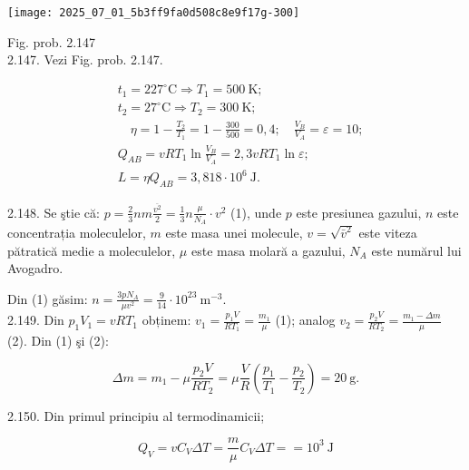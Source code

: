 \begin{center}
\texttt{[image: 2025\_07\_01\_5b3ff9fa0d508c8e9f17g-300]}
\end{center}

Fig. prob. 2.147\\
2.147. Vezi Fig. prob. 2.147.

$$
\begin{aligned}
& t_{1}=227^{\circ} \mathrm{C} \Rightarrow T_{1}=500 \mathrm{~K} ; \\
& t_{2}=27^{\circ} \mathrm{C} \Rightarrow T_{2}=300 \mathrm{~K} ; \\
& \quad \eta=1-\frac{T_{2}}{T_{1}}=1-\frac{300}{500}=0,4 ; \quad \frac{V_{B}}{V_{A}}=\varepsilon=10 ; \\
& Q_{A B}=v R T_{1} \ln \frac{V_{B}}{V_{A}}=2,3 v R T_{1} \ln \varepsilon ; \\
& L=\eta Q_{A B}=3,818 \cdot 10^{6} \mathrm{~J} .
\end{aligned}
$$

2.148. Se ştie că: $p=\frac{2}{3} n m \frac{\overline{v^{2}}}{2}=\frac{1}{3} n \frac{\mu}{N_{A}} \cdot v^{2}$ (1), unde $p$ este presiunea gazului, $n$ este concentrația moleculelor, $m$ este masa unei molecule, $v=\sqrt{\bar{v}^{2}}$ este viteza pătratică medie a moleculelor, $\mu$ este masa molară a gazului, $N_{A}$ este numărul lui Avogadro.

Din (1) găsim: $n=\frac{3 p N_{A}}{\mu v^{2}}=\frac{9}{14} \cdot 10^{23} \mathrm{~m}^{-3}$.\\
2.149. Din $p_{1} V_{1}=v R T_{1}$ obținem: $v_{1}=\frac{p_{1} V}{R T_{1}}=\frac{m_{1}}{\mu}$ (1); analog $v_{2}=\frac{p_{2} V}{R T_{2}}=\frac{m_{1}-\Delta m}{\mu}$ (2). Din (1) şi (2):

$$
\Delta m=m_{1}-\mu \frac{p_{2} V}{R T_{2}}=\mu \frac{V}{R}\left(\frac{p_{1}}{T_{1}}-\frac{p_{2}}{T_{2}}\right)=20 \mathrm{~g} .
$$

2.150. Din primul principiu al termodinamicii;

$$
Q_{V}=v C_{V} \Delta T=\frac{m}{\mu} C_{V} \Delta T==10^{3} \mathrm{~J}
$$

